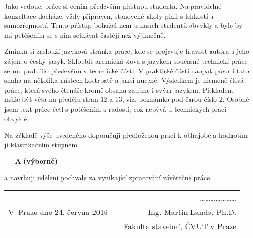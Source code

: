 \documentclass[czech,11pt,a4paper]{article}
\begin{document}
Jako vedoucí práce si cením především přístupu studenta. Na pravidelné
konzultace dochá\-zel vždy připraven, stanovené úkoly plnil s lehkostí
a samozřejmostí. Tento přístup bohužel není u našich studentů obvyklý
a bylo by mi potěšením se s ním setkávat častěji než
výjimečně. \newline

Zmínku si zaslouží jazyková stránka práce, kde se projevuje hravost
autora a jeho zájem o český jazyk. Skloubit archaická slova s jazykem
současné technické práce se mu podařilo především v teoretické
části. V praktické části naopak působí tato snaha na několika místech
kostrbatě a jaksi nuceně. Výsledkem je nicméně čtivá práce, která
svého čtenáře kromě obsahu zaujme i svým jazykem. Příkladem může být
věta na předělu stran 12 a 13, viz. poznámka pod čarou číslo 2. Osobně
jsem text práce četl s potěšením a radostí, což nebývá u technických
prací obvyklé. \newline

\newpage

Na základě výše uvedeného doporučuji předloženou práci k obhajobě a
hodnotím ji klasifikačním stupněm

\begin{center}
  {\bf --- A (výborně) --- }
\end{center}

\noindent a navrhuji udělení pochvaly za vynikající zpracování závěrečné práce.

\vskip 2cm

\begin{tabular}{lp{}r}
& & \ldots\ldots\ldots\ldots\ldots\ldots\ldots \\
V~Praze dne 24. června 2016 & & Ing. Martin Landa, Ph.D. \\
& & Fakulta stavební, ČVUT v Praze \\
\end{tabular}
\end{document}

